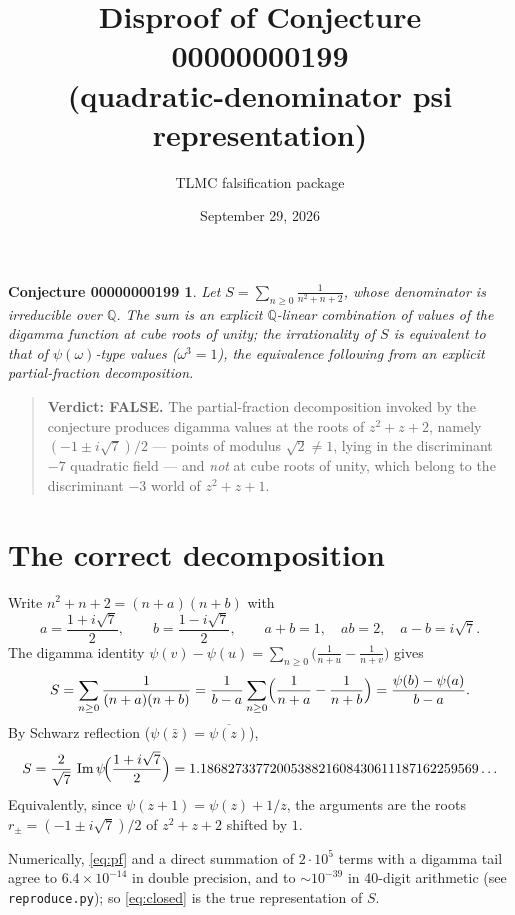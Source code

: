 \documentclass[11pt]{article}
\title{Disproof of Conjecture 00000000199\\
\large (quadratic-denominator psi representation)}
\author{TLMC falsification package}
\date{September 29, 2026}
\newtheorem*{conj*}{Conjecture 00000000199}
\newcommand{\ii}{\ensuremath{i}}
\newcommand{\ps}{\psi}
\begin{document}
\maketitle

\begin{conj*}
Let $S=\sum_{n\ge 0}\frac{1}{n^2+n+2}$, whose denominator is irreducible over $\mathbb{Q}$.
The sum is an explicit $\mathbb{Q}$-linear combination of values of the digamma function at
\emph{cube roots of unity}; the irrationality of $S$ is equivalent to that of $\ps(\omega)$-type
values ($\omega^3=1$), the equivalence following from an explicit partial-fraction decomposition.
\end{conj*}

\begin{quote}
\textbf{Verdict: FALSE.} The partial-fraction decomposition invoked by the conjecture produces
digamma values at the roots of $z^2+z+2$, namely $(-1\pm \ii\sqrt7)/2$ --- points of modulus
$\sqrt2\ne 1$, lying in the discriminant $-7$ quadratic field --- and \emph{not} at cube roots
of unity, which belong to the discriminant $-3$ world of $z^2+z+1$.
\end{quote}

\section{The correct decomposition}

Write $n^2+n+2=(n+a)(n+b)$ with
\[
a=\frac{1+\ii\sqrt7}{2},\qquad b=\frac{1-\ii\sqrt7}{2},\qquad a+b=1,\quad ab=2,\quad a-b=\ii\sqrt7 .
\]
The digamma identity $\ps(v)-\ps(u)=\sum_{n\ge0}\bigl(\frac1{n+u}-\frac1{n+v}\bigr)$ gives
\begin{equation}\label{eq:pf}
S=\sum_{n\ge0}\frac{1}{(n+a)(n+b)}
 =\frac{1}{b-a}\sum_{n\ge0}\Bigl(\frac1{n+a}-\frac1{n+b}\Bigr)
 =\frac{\ps(b)-\ps(a)}{b-a}.
\end{equation}
By Schwarz reflection ($\ps(\bar z)=\overline{\ps(z)}$),
\begin{equation}\label{eq:closed}
S=\frac{2}{\sqrt7}\,\operatorname{Im}\ps\!\Bigl(\frac{1+\ii\sqrt7}{2}\Bigr)
 =1.1868273377200538821608430611187162259569\ldots
\end{equation}
Equivalently, since $\ps(z+1)=\ps(z)+1/z$, the arguments are the roots
$r_\pm=(-1\pm\ii\sqrt7)/2$ of $z^2+z+2$ shifted by $1$.

Numerically, \eqref{eq:pf} and a direct summation of $2\cdot10^5$ terms with a digamma tail
agree to $6.4\times10^{-14}$ in double precision, and to $\sim10^{-39}$ in 40-digit arithmetic
(see \texttt{reproduce.py}); so \eqref{eq:closed} is the true representation of $S$.
\end{document}
